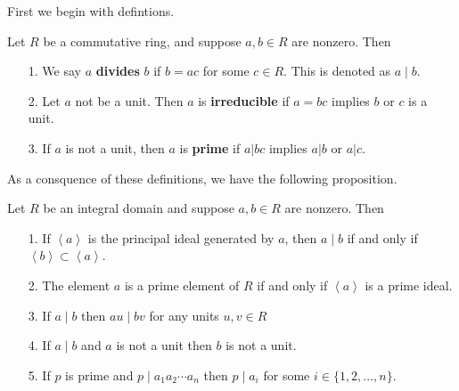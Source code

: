 First we begin with defintions. 

\begin{definition}
Let $R$ be a commutative ring, and suppose $a, b \in R$ are
nonzero. Then 
\begin{itemize}
    \item [1.] We say $a$ \textbf{divides} $b$ if $b = ac$ for
    some $c \in R$. This is denoted as $a\mid b$.
    \item [2.] Let $a$ not be a unit. Then $a$ is \textbf{irreducible} if $a = bc$
    implies $b$ or $c$ is a unit. 
    \item [3.] If $a$ is not a unit, then $a$ is \textbf{prime} if
    $a | bc$ implies $a|b$ or $a | c$. 
\end{itemize}
\end{definition}

As a consquence of these definitions, we have the following
proposition. 
\begin{proposition} 
Let $R$ be an integral domain and suppose $a, b \in R$ are
nonzero. Then 
\begin{itemize}
    \item[1.] If $\left< a \right>$ is the principal ideal
    generated by $a$, then $a \mid b$ if and only if $\left< b
    \right> \subset \left< a \right>$. 

    \item[2.] The element $a$ is a prime element of $R$ if and
    only if $\left< a \right>$ is a prime ideal.

    \item[3.] If $a \mid b$ then $au \mid bv$ for any units $u,v
    \in R$ 

    \item[4.] If $a \mid b$ and $a$ is not a unit then $b$ is not
    a unit. 

    \item[5.] If $p$ is prime and $p \mid a_1a_2\cdots a_n$ then
    $p \mid a_i$ for some $i \in \{1, 2, \dots, n\}$.
\end{itemize}
\end{proposition}

